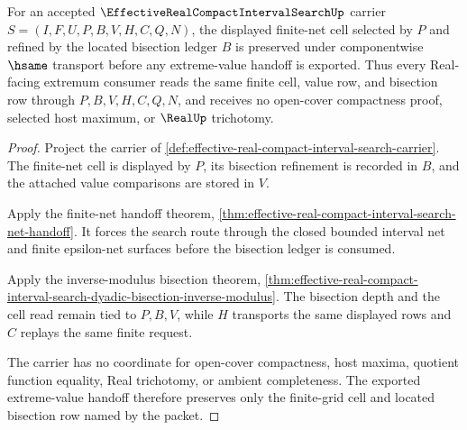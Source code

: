 \begin{theorem}
\label{thm:effective-real-compact-interval-search-grid-stability}
For an accepted $\EffectiveRealCompactIntervalSearchUp$ carrier $S=(I,F,U,P,B,V,H,C,Q,N)$, the displayed finite-net cell selected by $P$ and refined by the located bisection ledger $B$ is preserved under componentwise $\hsame$ transport before any extreme-value handoff is exported. Thus every Real-facing extremum consumer reads the same finite cell, value row, and bisection row through $P,B,V,H,C,Q,N$, and receives no open-cover compactness proof, selected host maximum, or $\RealUp$ trichotomy.
\end{theorem}
\begin{proof}
Project the carrier of \autoref{def:effective-real-compact-interval-search-carrier}. The finite-net cell is displayed by $P$, its bisection refinement is recorded in $B$, and the attached value comparisons are stored in $V$.

Apply the finite-net handoff theorem, \autoref{thm:effective-real-compact-interval-search-net-handoff}. It forces the search route through the closed bounded interval net and finite epsilon-net surfaces before the bisection ledger is consumed.

Apply the inverse-modulus bisection theorem, \autoref{thm:effective-real-compact-interval-search-dyadic-bisection-inverse-modulus}. The bisection depth and the cell read remain tied to $P,B,V$, while $H$ transports the same displayed rows and $C$ replays the same finite request.

The carrier has no coordinate for open-cover compactness, host maxima, quotient function equality, Real trichotomy, or ambient completeness. The exported extreme-value handoff therefore preserves only the finite-grid cell and located bisection row named by the packet.
\end{proof}

